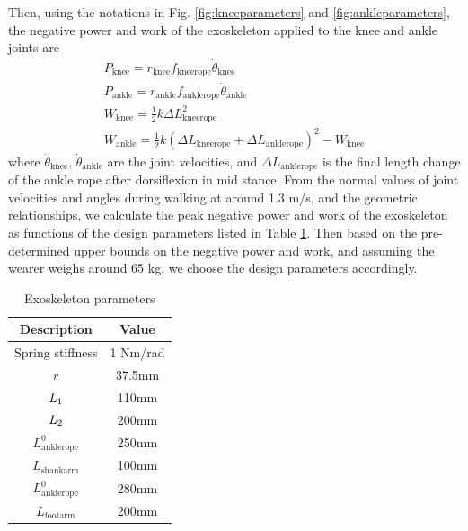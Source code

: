 \documentclass[10pt]{asme2ej}
\begin{document}
Then, using the notations in Fig. \ref{fig:kneeparameters} and \ref{fig:ankleparameters}, the negative power and work of the exoskeleton applied to the knee and ankle joints are
\begin{gather}
	P_\mathrm{knee} = r_\mathrm{knee}f_\mathrm{kneerope}\dot{\theta}_\mathrm{knee} \\
	P_\mathrm{ankle} = r_\mathrm{ankle}f_\mathrm{anklerope}\dot{\theta}_\mathrm{ankle} \\
	W_\mathrm{knee} = \frac{1}{2}k\Delta L_\mathrm{kneerope}^2 \\
	W_\mathrm{ankle} = \frac{1}{2}k(\Delta L_\mathrm{kneerope}+\Delta L_\mathrm{anklerope})^2 - W_\mathrm{knee}
\end{gather}
where $\dot{\theta}_\mathrm{knee}$, $\dot{\theta}_\mathrm{ankle}$ are the joint velocities, and $\Delta L_\mathrm{anklerope}$ is the final length change of the ankle rope after dorsiflexion in mid stance.
From the normal values of joint velocities and angles during walking at around 1.3 m/s, and the geometric relationships, we calculate the peak negative power and work of the exoskeleton as functions of the design parameters listed in Table \ref{tab:Exoskeleton parameters}.
Then based on the pre-determined upper bounds on the negative power and work, and assuming the wearer weighs around 65 kg, we choose the design parameters accordingly.



\begin{table}[t]
	\caption{Exoskeleton parameters}
	\begin{center}
		\label{tab:Exoskeleton parameters}
		\begin{tabular}{c c}	
			\hline
			\textbf{Description } & \textbf{Value} \\
			\hline
			Spring stiffness & 1 Nm/rad\\
			$r$ & 37.5mm\\
			$L_\textrm1$ & 110mm\\
			$L_\textrm2$ & 200mm\\
			$L_\textrm{anklerope}^0$ & 250mm\\
			$L_\textrm{shankarm}$  & 100mm\\
			$L_\textrm{anklerope}^0$ & 280mm\\
			$L_\textrm{footarm}$ & 200mm\\
			\hline
		\end{tabular}
	\end{center}
\end{table}
\end{document}
